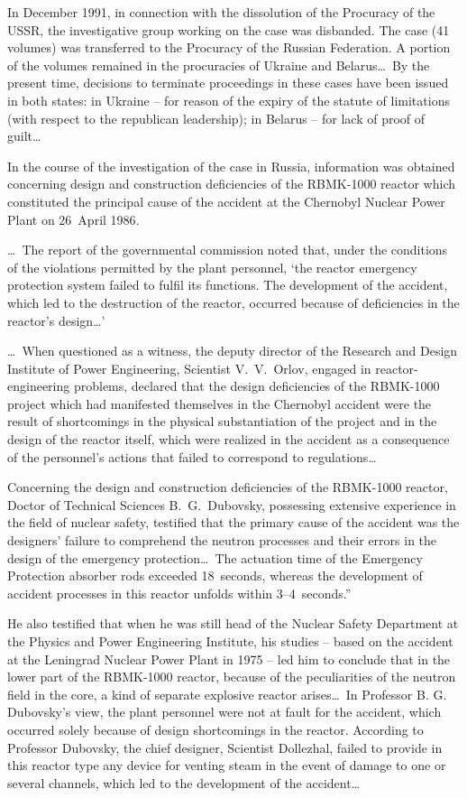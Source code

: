 \documentclass[openright]{bookest}
\begin{document}
In December 1991, in connection with the dissolution of the Procuracy of the USSR, the investigative group working on the case was disbanded. The case (41 volumes) was transferred to the Procuracy of the Russian Federation. A portion of the volumes remained in the procuracies of Ukraine and Belarus\ldots~By the present time, decisions to terminate proceedings in these cases have been issued in both states: in Ukraine -- for reason of the expiry of the statute of limitations (with respect to the republican leadership); in Belarus -- for lack of proof of guilt\ldots

In the course of the investigation of the case in Russia, information was obtained concerning design and construction deficiencies of the RBMK-1000 reactor which constituted the principal cause of the accident at the Chernobyl Nuclear Power Plant on 26~April 1986.

\ldots~The report of the governmental commission noted that, under the conditions of the violations permitted by the plant personnel, `the reactor emergency protection system failed to fulfil its functions. The development of the accident, which led to the destruction of the reactor, occurred because of deficiencies in the reactor's design\ldots'

\ldots~When questioned as a witness, the deputy director of the Research and Design Institute of Power Engineering, Scientist V.~V.~Orlov, engaged in reactor-engineering problems, declared that the design deficiencies of the RBMK-1000 project which had manifested themselves in the Chernobyl accident were the result of shortcomings in the physical substantiation of the project and in the design of the reactor itself, which were realized in the accident as a consequence of the personnel's actions that failed to correspond to regulations\ldots

Concerning the design and construction deficiencies of the RBMK-1000 reactor, Doctor of Technical Sciences B.~G.~Dubovsky, possessing extensive experience in the field of nuclear safety, testified that the primary cause of the accident was the designers' failure to comprehend the neutron processes and their errors in the design of the emergency protection\ldots~The actuation time of the Emergency Protection absorber rods exceeded \num{18}~seconds, whereas the development of accident processes in this reactor unfolds within 3--4~seconds.''

He also testified that when he was still head of the Nuclear Safety Department at the Physics and Power Engineering Institute, his studies -- based on the accident at the Leningrad Nuclear Power Plant in 1975 -- led him to conclude that in the lower part of the RBMK-1000 reactor, because of the peculiarities of the neutron field in the core, a kind of separate explosive reactor arises\ldots~In Professor B. G. Dubovsky's view, the plant personnel were not at fault for the accident, which occurred solely because of design shortcomings in the reactor. According to Professor Dubovsky, the chief designer, Scientist Dollezhal, failed to provide in this reactor type any device for venting steam in the event of damage to one or several channels, which led to the development of the accident\ldots
\end{document}
